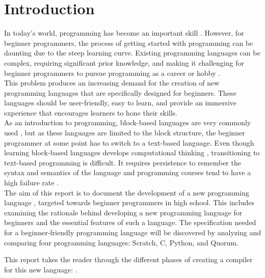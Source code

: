 \chapter{Introduction}\label{ch:introduction}
In today's world, programming has become an important skill \cite{ProgrammingImportant}. However, for beginner programmers, the process of getting started with programming can be daunting due to the steep learning curve. Existing programming languages can be complex, requiring significant prior knowledge, and making it challenging for beginner programmers to pursue programming as a career or hobby \cite{LearningCodeIsHard}.\\
This problem produces an increasing demand for the creation of new programming languages that are specifically designed for beginners\cite{demandforlanguages}. These languages should be user-friendly, easy to learn, and provide an immersive experience that encourages learners to hone their skills.\\

\noindent As an introduction to programming, block-based languages are very commonly used \cite{FromBlockToText}, but as these languages are limited to the block structure, the beginner programmer at some point has to switch to a text-based language. Even though learning block-based languages develops computational thinking \cite{FromBlockToText}, transitioning to text-based programming is difficult. It requires persistence to remember the syntax and semantics of the language and programming courses tend to have a high failure rate
\cite{FactorsDifficultiesInProgramming}.\\

\noindent The aim of this report is to document the development of a new programming language \lang, targeted towards beginner programmers in high school. This includes examining the rationale behind developing a new programming language for beginners and the essential features of such a language.
The specification needed for a beginner-friendly programming language will be discovered by analyzing and comparing four programming languages: Scratch, C, Python, and Quorum.

\noindent This report takes the reader through the different phases of creating a compiler for this new language: \lang.